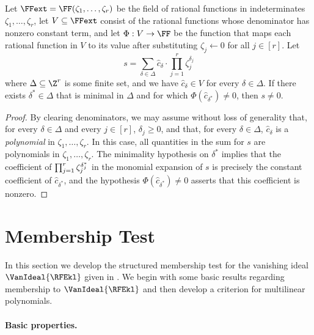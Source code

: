 \documentclass{toc}
\begin{document}
\begin{proposition} \label{prop.multi-zsub-deriv.helper}
  Let \(\FFext = \FF(\zeta_1,\ldots,\zeta_r)\) be the field of rational
  functions in indeterminates \(\zeta_1, \ldots, \zeta_r\),
  let \(V \subseteq \FFext\) consist of the rational functions whose
  denominator has nonzero constant term,
  and let \(\Phi : V \to \FF\) be the function that maps each rational
  function in \(V\) to its value after substituting \(\zeta_j \gets 0\)
  for all \(j \in [r]\).
  Let
  \[
    s = \sum_{\delta\in \Delta} \hat{c}_\delta \cdot \prod_{j=1}^r \zeta_j^{\delta_j}
  \]
  where \(\Delta \subseteq \Z^r\) is some finite set,
  and
  we have \(\hat{c}_\delta \in V\)
  for every \(\delta \in \Delta\).
  If there exists \(\delta^* \in \Delta\)
  that is minimal in $\Delta$
  and
  for which \(\Phi(\hat{c}_{\delta^*}) \ne 0\),
  then $s \ne 0$.
\end{proposition}
\begin{proof}
  By clearing denominators,
  we may assume without loss of generality
  that,
    for every \(\delta \in \Delta\) and every $j \in [r]$,
    \(\delta_j \ge 0\),
  and that,
    for every \(\delta \in \Delta\),
    \(\hat{c}_\delta\) is a \emph{polynomial} in \(\zeta_1, \ldots, \zeta_r\).
  In this case, all quantities in the sum for \(s\) are polynomials in
  \(\zeta_1,\ldots,\zeta_r\).
  The minimality hypothesis on \(\delta^*\) implies that
  the coefficient of \(\prod_{j=1}^r \zeta_j^{\smash{\delta^*_j}}\) in the monomial
  expansion of \(s\) is precisely the constant coefficient of
  \(\hat{c}_{\delta^*}\),
  and the hypothesis \(\Phi(\hat{c}_{\delta^*}) \ne 0\) asserts that this
  coefficient is nonzero.
\end{proof}



\section{Membership Test}
\label{s.test}

In this section we develop the structured membership test for the vanishing ideal $\VanIdeal{\RFEkl}$ given in .
We begin with some basic results regarding membership to $\VanIdeal{\RFEkl}$ and then develop a criterion for multilinear polynomials.

\paragraph{Basic properties.}
\end{document}
